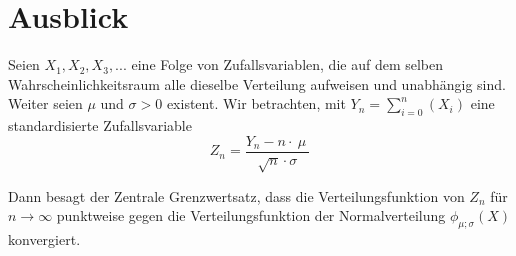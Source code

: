 \documentclass[12pt,a4paper,twocolumn]{article}
\begin{document}
\section{Ausblick}
Seien $X_1, X_2, X_3, ...$ eine Folge von Zufallsvariablen, die auf dem selben Wahrscheinlichkeitsraum alle dieselbe Verteilung aufweisen und unabhängig sind. Weiter seien $\mu$ und $\sigma > 0$ existent.
Wir betrachten, mit $Y_n=\sum\limits_{i=0}^{n}(X_{i})$ eine standardisierte Zufallsvariable 
$$
Z_n=\frac{Y_{n}-n\cdot\ \mu\ }{\sqrt{n}\cdot \sigma}
$$

Dann besagt der Zentrale Grenzwertsatz, dass die Verteilungsfunktion von $Z_n$ für $n \rightarrow \infty$ punktweise gegen die Verteilungsfunktion der Normalverteilung $\phi_{\mu;\sigma}(X)$ konvergiert. 


\onecolumn
\pagebreak
\end{document}
